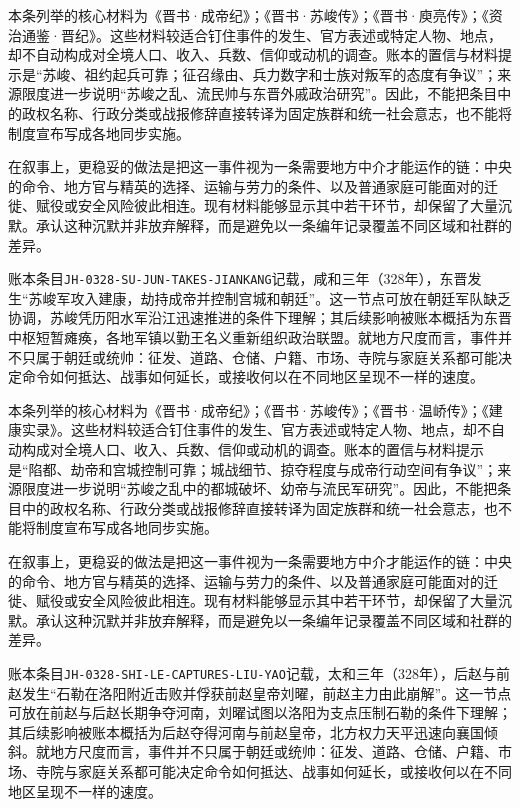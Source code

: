 本条列举的核心材料为《晋书·成帝纪》；《晋书·苏峻传》；《晋书·庾亮传》；《资治通鉴·晋纪》。这些材料较适合钉住事件的发生、官方表述或特定人物、地点，却不自动构成对全境人口、收入、兵数、信仰或动机的调查。账本的置信与材料提示是“苏峻、祖约起兵可靠；征召缘由、兵力数字和士族对叛军的态度有争议”；来源限度进一步说明“苏峻之乱、流民帅与东晋外戚政治研究”。因此，不能把条目中的政权名称、行政分类或战报修辞直接转译为固定族群和统一社会意志，也不能将制度宣布写成各地同步实施。

在叙事上，更稳妥的做法是把这一事件视为一条需要地方中介才能运作的链：中央的命令、地方官与精英的选择、运输与劳力的条件、以及普通家庭可能面对的迁徙、赋役或安全风险彼此相连。现有材料能够显示其中若干环节，却保留了大量沉默。承认这种沉默并非放弃解释，而是避免以一条编年记录覆盖不同区域和社群的差异。

账本条目\texttt{JH-0328-SU-JUN-TAKES-JIANKANG}记载，咸和三年（328年），东晋发生“苏峻军攻入建康，劫持成帝并控制宫城和朝廷”。这一节点可放在朝廷军队缺乏协调，苏峻凭历阳水军沿江迅速推进的条件下理解；其后续影响被账本概括为东晋中枢短暂瘫痪，各地军镇以勤王名义重新组织政治联盟。就地方尺度而言，事件并不只属于朝廷或统帅：征发、道路、仓储、户籍、市场、寺院与家庭关系都可能决定命令如何抵达、战事如何延长，或接收何以在不同地区呈现不一样的速度。

本条列举的核心材料为《晋书·成帝纪》；《晋书·苏峻传》；《晋书·温峤传》；《建康实录》。这些材料较适合钉住事件的发生、官方表述或特定人物、地点，却不自动构成对全境人口、收入、兵数、信仰或动机的调查。账本的置信与材料提示是“陷都、劫帝和宫城控制可靠；城战细节、掠夺程度与成帝行动空间有争议”；来源限度进一步说明“苏峻之乱中的都城破坏、幼帝与流民军研究”。因此，不能把条目中的政权名称、行政分类或战报修辞直接转译为固定族群和统一社会意志，也不能将制度宣布写成各地同步实施。

在叙事上，更稳妥的做法是把这一事件视为一条需要地方中介才能运作的链：中央的命令、地方官与精英的选择、运输与劳力的条件、以及普通家庭可能面对的迁徙、赋役或安全风险彼此相连。现有材料能够显示其中若干环节，却保留了大量沉默。承认这种沉默并非放弃解释，而是避免以一条编年记录覆盖不同区域和社群的差异。

账本条目\texttt{JH-0328-SHI-LE-CAPTURES-LIU-YAO}记载，太和三年（328年），后赵与前赵发生“石勒在洛阳附近击败并俘获前赵皇帝刘曜，前赵主力由此崩解”。这一节点可放在前赵与后赵长期争夺河南，刘曜试图以洛阳为支点压制石勒的条件下理解；其后续影响被账本概括为后赵夺得河南与前赵皇帝，北方权力天平迅速向襄国倾斜。就地方尺度而言，事件并不只属于朝廷或统帅：征发、道路、仓储、户籍、市场、寺院与家庭关系都可能决定命令如何抵达、战事如何延长，或接收何以在不同地区呈现不一样的速度。

